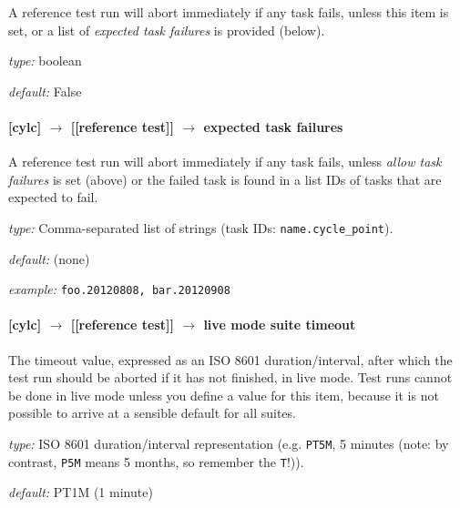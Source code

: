 A reference test run will abort immediately if any task fails, unless
this item is set, or a list of {\em expected task failures} is provided
(below).

\begin{myitemize}
    \item {\em type:} boolean
    \item {\em default:} False
\end{myitemize}

\paragraph[expected task failures]{[cylc] $\rightarrow$ [[reference test]] $\rightarrow$ expected task failures}

A reference test run will abort immediately if any task fails, unless
{\em allow task failures} is set (above) or the failed task is found
in a list IDs of tasks that are expected to fail.

\begin{myitemize}
    \item {\em type:} Comma-separated list of strings (task IDs: \lstinline=name.cycle_point=).
    \item {\em default:} (none)
    \item {\em example:} \lstinline=foo.20120808, bar.20120908=
\end{myitemize}

\paragraph[live mode suite timeout]{[cylc] $\rightarrow$ [[reference test]] $\rightarrow$ live mode suite timeout}

The timeout value, expressed as an ISO 8601 duration/interval, after which the
test run should be aborted if it has not finished, in live mode. Test runs
cannot be done in live mode unless you define a value for this item, because
it is not possible to arrive at a sensible default for all suites.

\begin{myitemize}
    \item {\em type:} ISO 8601 duration/interval representation (e.g.
 \lstinline=PT5M=, 5 minutes (note: by contrast, \lstinline=P5M= means 5
 months, so remember the \lstinline=T=!)).
    \item {\em default:} PT1M (1 minute)
\end{myitemize}


